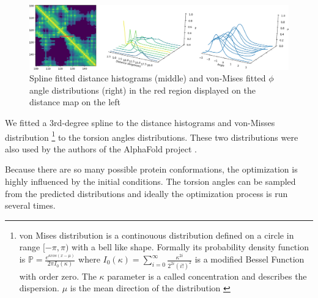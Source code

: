 \begin{figure}
    \centering
    \includegraphics[scale=0.14]{imgs_tomas/histograms.png}
    \caption{Spline fitted distance histograms (middle) and von-Mises fitted $\phi$ angle distributions (right) in the red region displayed on the distance map on the left}
    \label{fig:smooth_fits}
\end{figure}

We fitted a 3rd-degree spline to the distance histograms and von-Misses distribution \footnote{von Mises distribution is a continouous distribution defined on a circle in range $[-\pi, \pi)$ with a bell like shape. Formally its probability density function is $\mathds{P} = \frac{e^{\kappa cos(x - \mu)}}{2\pi I_0(\kappa)}$ where $I_0(\kappa) = \sum_{i=0}^\infty \frac{\kappa^{2i}}{2^{2i}(i!)^2}$ is a modified Bessel Function with order zero. 
The $\kappa$ parameter is a called concentration and describes the dispersion. 
$\mu$ is the mean direction of the distribution \cite{vonmises}} to the torsion angles distributions. 
These two distributions were also used by the authors of the AlphaFold project \cite{alphafold}.

Because there are so many possible protein conformations, the optimization is highly influenced by the initial conditions. 
The torsion angles can be sampled from the predicted distributions and ideally the optimization process is run several times.  
        
        
        
